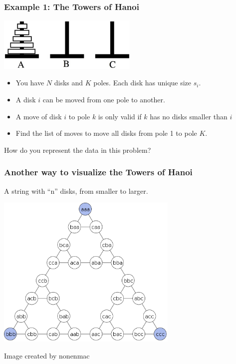\documentclass{beamer}
\begin{document}
\begin{frame}
  \frametitle{Example 1: The Towers of Hanoi}
  
  \begin{center}
    \includegraphics[width=0.5\textwidth]{img/hanoi}
  \end{center}
  \medskip

  {\small
    \begin{itemize}
    \item You have $N$ disks and $K$ poles. Each disk has unique size $s_i$.
    \item A disk $i$ can be moved from one pole to another.
    \item A move of disk $i$ to pole $k$ is only valid if $k$ has no disks smaller than $i$
    \item Find the list of moves to move all disks from pole 1 to pole $K$.
    \end{itemize}
  }
  
  \vfill

  How do you represent the data in this problem?
\end{frame}

\begin{frame}
  \frametitle{Another way to visualize the Towers of Hanoi}
  A string with ``n'' disks, from smaller to larger.
  \begin{center}
    \includegraphics[width=0.65\textwidth]{img/hanoi_graph}
  \end{center}
  {\tiny \hfill Image created by nonenmac}
\end{frame}
\end{document}
